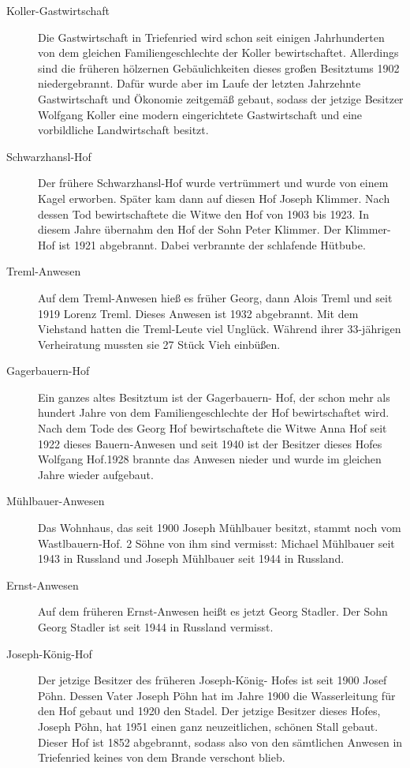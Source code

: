 \documentclass{book}
\begin{document}
\begin{description}
\item[Koller-Gastwirtschaft] Die Gastwirtschaft in Triefenried wird
schon seit einigen Jahrhunderten von dem gleichen Familiengeschlechte
der Koller bewirtschaftet. Allerdings sind die früheren hölzernen
Gebäulichkeiten dieses großen Besitztums 1902 niedergebrannt. Dafür
wurde aber im Laufe der letzten Jahrzehnte Gastwirtschaft und Ökonomie
zeitgemäß gebaut, sodass der jetzige Besitzer Wolfgang Koller eine
modern eingerichtete Gastwirtschaft und eine vorbildliche Landwirtschaft
besitzt.

\item[Schwarzhansl-Hof] Der frühere Schwarzhansl-Hof wurde vertrümmert
und wurde von einem Kagel erworben. Später kam dann auf diesen Hof
Joseph Klimmer. Nach dessen Tod bewirtschaftete die Witwe den Hof von
1903 bis 1923. In diesem Jahre übernahm den Hof der Sohn Peter Klimmer.
Der Klimmer-Hof ist 1921 abgebrannt. Dabei verbrannte der schlafende
Hütbube.

\item[Treml-Anwesen] Auf dem Treml-Anwesen hieß es früher Georg, dann
Alois Treml und seit 1919 Lorenz Treml. Dieses Anwesen ist 1932
abgebrannt. Mit dem Viehstand hatten die Treml-Leute viel Unglück.
Während ihrer 33-jährigen Verheiratung mussten sie 27 Stück Vieh
einbüßen.

\item[Gagerbauern-Hof] Ein ganzes altes Besitztum ist der Gagerbauern-
Hof, der schon mehr als hundert Jahre von dem Familiengeschlechte der
Hof bewirtschaftet wird. Nach dem Tode des Georg Hof bewirtschaftete die
Witwe Anna Hof seit 1922 dieses Bauern-Anwesen und seit 1940 ist der
Besitzer dieses Hofes Wolfgang Hof.1928 brannte das Anwesen nieder und
wurde im gleichen Jahre wieder aufgebaut.

\item[Mühlbauer-Anwesen] Das Wohnhaus, das seit 1900 Joseph Mühlbauer
besitzt, stammt noch vom Wastlbauern-Hof. 2 Söhne von ihm sind vermisst:
Michael Mühlbauer seit 1943 in Russland und Joseph Mühlbauer seit 1944
in Russland.

\item[Ernst-Anwesen] Auf dem früheren Ernst-Anwesen heißt es jetzt Georg
Stadler. Der Sohn Georg Stadler ist seit 1944 in Russland vermisst.

\item[Joseph-König-Hof] Der jetzige Besitzer des früheren Joseph-König-%
Hofes ist seit 1900 Josef Pöhn. Dessen Vater Joseph Pöhn hat im Jahre
1900 die Wasserleitung für den Hof gebaut und 1920 den Stadel. Der
jetzige Besitzer dieses Hofes, Joseph Pöhn, hat 1951 einen ganz
neuzeitlichen, schönen Stall gebaut. Dieser Hof ist 1852 abgebrannt,
sodass also von den sämtlichen Anwesen in Triefenried keines von dem
Brande verschont blieb.


\end{description}
\end{document}
